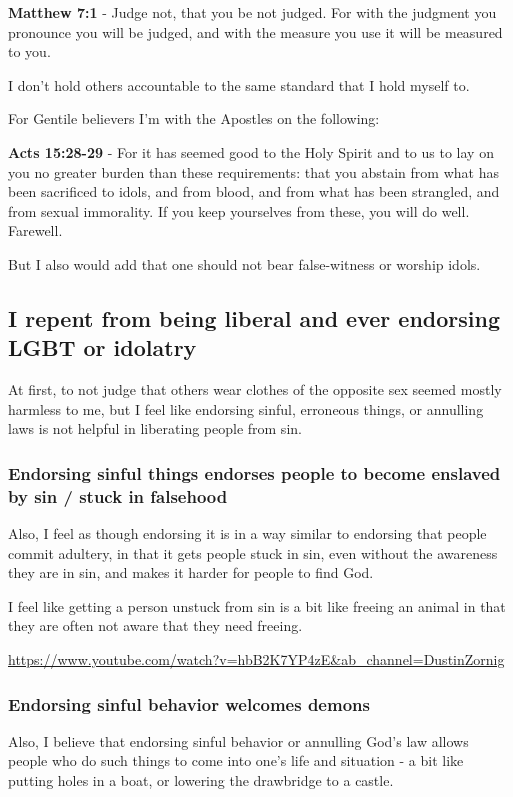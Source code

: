 \documentclass[11pt]{article}
\begin{document}
\textbf{Matthew 7:1} - Judge not, that you be not judged.  For with the judgment you pronounce you will be judged, and with the measure you use it will be measured to you.

I don't hold others accountable to the same standard that I hold myself to.

For Gentile believers I'm with the Apostles on the following:

\textbf{Acts 15:28-29} - For it has seemed good to the Holy Spirit and to us to lay on you no greater burden than these requirements: that you abstain from what has been sacrificed to idols, and from blood, and from what has been strangled, and from sexual immorality. If you keep yourselves from these, you will do well. Farewell.

But I also would add that one should not bear false-witness or worship idols.

\subsection{I repent from being liberal and ever endorsing LGBT or idolatry}
\label{sec:org37e0c7f}
At first, to not judge that others wear
clothes of the opposite sex seemed mostly
harmless to me, but I feel like endorsing
sinful, erroneous things, or annulling laws
is not helpful in liberating people from sin.

\subsubsection{Endorsing sinful things endorses people to become enslaved by sin / stuck in falsehood}
\label{sec:orgffe76c8}
Also, I feel as though endorsing it is in a
way similar to endorsing that people commit
adultery, in that it gets people stuck in sin,
even without the awareness they are in sin,
and makes it harder for people to find God.

I feel like getting a person unstuck from sin
is a bit like freeing an animal in that they
are often not aware that they need freeing.

\url{https://www.youtube.com/watch?v=hbB2K7YP4zE\&ab\_channel=DustinZornig}

\subsubsection{Endorsing sinful behavior welcomes demons}
\label{sec:orgd120176}
Also, I believe that endorsing sinful behavior
or annulling God's law allows people who do
such things to come into one's life and
situation - a bit like putting holes in a
boat, or lowering the drawbridge to a castle.
\end{document}
